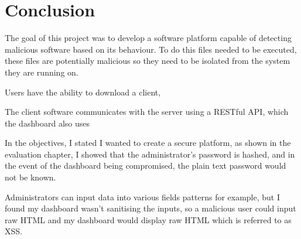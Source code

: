 \chapter{Conclusion}

The goal of this project was to develop a software platform capable of
detecting malicious software based on its behaviour.
To do this files needed to be executed, these files are potentially malicious
so they need to be isolated from the system they are running on.

Users have the ability to download a client, 

The client software communicates with the server using a
RESTful API, which the dashboard also uses

In the objectives, I stated I wanted to create a secure platform, as shown in the evaluation chapter, I showed that the administrator's password is hashed, and in the event of the dashboard being compromised, the plain text password would not be known.

Administrators can input data into various fields patterns for example,
but I found my dashboard wasn't sanitising the inputs,
so a malicious user could input raw HTML and my dashboard would
display raw HTML which is referred to as XSS.
